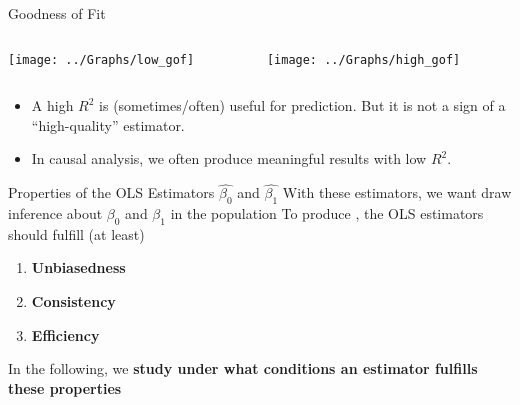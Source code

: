 \begin{frame}{Goodness of Fit}
\begin{columns}[T]
\begin{column}{0.5\textwidth}
\begin{center}
\end{center}
\texttt{[image: ../Graphs/low\_gof]}
\end{column}
\begin{column}{0.5\textwidth}
\begin{center}
\end{center}
\texttt{[image: ../Graphs/high\_gof]}
\end{column}
\end{columns}
\begin{itemize}
\item A  high $R^2$ is (sometimes/often) useful for prediction. But it is not a sign of a ``high-quality'' estimator.
\item In causal analysis, we often produce meaningful results with low $R^2$.
\end{itemize}
\end{frame}

\begin{frame}{Properties of the OLS Estimators $\widehat{\beta_0}$ and $\widehat{\beta_1}$}
With these estimators, we want draw inference about $\beta_0$ and $\beta_1$ in the population
\vfill
To produce , the OLS estimators should fulfill (at least) 
\begin{enumerate}
\item \textbf{Unbiasedness}
\item \textbf{Consistency}
\item \textbf{Efficiency}
\end{enumerate}
\vfill
In the following, we \textbf{study under what conditions an estimator fulfills these properties} 
\end{frame}


